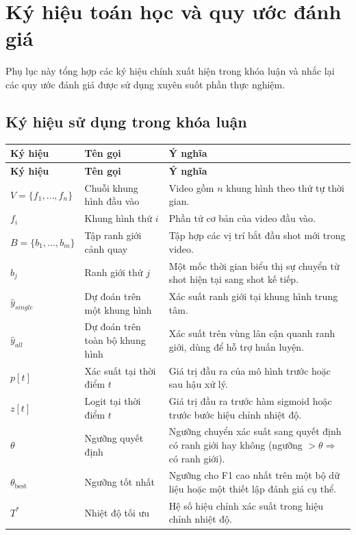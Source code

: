 \appendix

\chapter{Ký hiệu toán học và quy ước đánh giá}

Phụ lục này tổng hợp các ký hiệu chính xuất hiện trong khóa luận và nhắc lại các quy ước đánh giá được sử dụng xuyên suốt phần thực nghiệm.

\section{Ký hiệu sử dụng trong khóa luận}

{
\small
\renewcommand{\arraystretch}{1.18}
\begin{longtable}{L{2.4cm}L{5.0cm}L{6.0cm}}
\toprule
\textbf{Ký hiệu} & \textbf{Tên gọi} & \textbf{Ý nghĩa} \\
\midrule
\endfirsthead
\toprule
\textbf{Ký hiệu} & \textbf{Tên gọi} & \textbf{Ý nghĩa} \\
\midrule
\endhead
$V=\{f_1,\dots,f_n\}$ & Chuỗi khung hình đầu vào & Video gồm $n$ khung hình theo thứ tự thời gian. \\
$f_i$ & Khung hình thứ $i$ & Phần tử cơ bản của video đầu vào. \\
$B=\{b_1,\dots,b_m\}$ & Tập ranh giới cảnh quay & Tập hợp các vị trí bắt đầu shot mới trong video. \\
$b_j$ & Ranh giới thứ $j$ & Một mốc thời gian biểu thị sự chuyển từ shot hiện tại sang shot kế tiếp. \\
$\hat{y}_{single}$ & Dự đoán trên một khung hình & Xác suất ranh giới tại khung hình trung tâm. \\
$\hat{y}_{all}$ & Dự đoán trên toàn bộ khung hình & Xác suất trên vùng lân cận quanh ranh giới, dùng để hỗ trợ huấn luyện. \\
$p[t]$ & Xác suất tại thời điểm $t$ & Giá trị đầu ra của mô hình trước hoặc sau hậu xử lý. \\
$z[t]$ & Logit tại thời điểm $t$ & Giá trị đầu ra trước hàm sigmoid hoặc trước bước hiệu chỉnh nhiệt độ. \\
$\theta$ & Ngưỡng quyết định & Ngưỡng chuyển xác suất sang quyết định có ranh giới hay không (ngưỡng $> \theta \Rightarrow$ có ranh giới). \\
$\theta_{\text{best}}$ & Ngưỡng tốt nhất & Ngưỡng cho F1 cao nhất trên một bộ dữ liệu hoặc một thiết lập đánh giá cụ thể. \\
$T^*$ & Nhiệt độ tối ưu & Hệ số hiệu chỉnh xác suất trong hiệu chỉnh nhiệt độ. \\

\end{longtable}}
